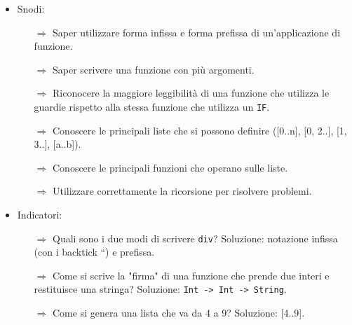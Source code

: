 \begin{itemize}
    \item Snodi:
    \begin{itemize}
        \item [$\Rightarrow$] Saper utilizzare forma infissa e forma prefissa di un'applicazione di funzione.
        \item [$\Rightarrow$] Saper scrivere una funzione con più argomenti.
        \item [$\Rightarrow$] Riconocere la maggiore leggibilità di una funzione che utilizza le guardie rispetto alla stessa funzione che utilizza un \texttt{IF}.
        \item [$\Rightarrow$] Conoscere le principali liste che si possono definire ([0..n], [0, 2..], [1, 3..], [a..b]).
        \item [$\Rightarrow$] Conoscere le principali funzioni che operano sulle liste.
        \item [$\Rightarrow$] Utilizzare correttamente la ricorsione per risolvere problemi.
    \end{itemize}
    \item Indicatori:
    \begin{itemize}
        \item [$\Rightarrow$] Quali sono i due modi di scrivere \texttt{div}? Soluzione: notazione infissa (con i backtick ``) e prefissa.
        \item [$\Rightarrow$] Come si scrive la "firma" di una funzione che prende due interi e restituisce una stringa? Soluzione: \texttt{Int -> Int -> String}.
        \item [$\Rightarrow$] Come si genera una lista che va da 4 a 9? Soluzione: [4..9].
    \end{itemize}
\end{itemize}


\paragraph{}


